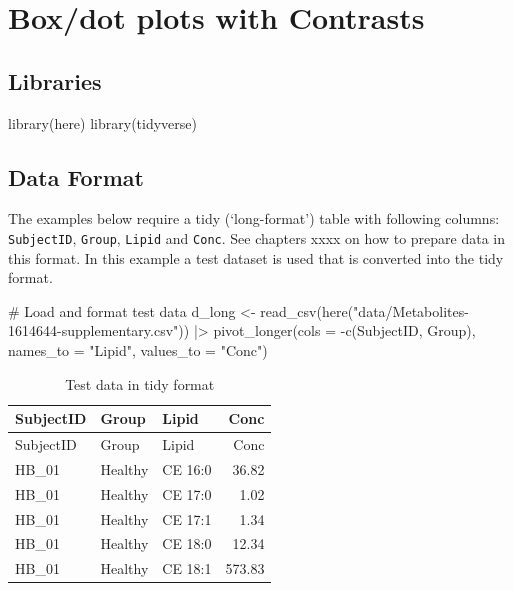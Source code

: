 \documentclass[
  letterpaper,
  DIV=11,
  numbers=noendperiod]{scrreprt}
\newenvironment{Shaded}{\begin{snugshade}}{\end{snugshade}}
\newcommand{\AttributeTok}[1]{\textcolor[rgb]{0.40,0.45,0.13}{#1}}
\newcommand{\CommentTok}[1]{\textcolor[rgb]{0.37,0.37,0.37}{#1}}
\newcommand{\FunctionTok}[1]{\textcolor[rgb]{0.28,0.35,0.67}{#1}}
\newcommand{\NormalTok}[1]{\textcolor[rgb]{0.00,0.23,0.31}{#1}}
\newcommand{\OtherTok}[1]{\textcolor[rgb]{0.00,0.23,0.31}{#1}}
\newcommand{\SpecialCharTok}[1]{\textcolor[rgb]{0.37,0.37,0.37}{#1}}
\newcommand{\StringTok}[1]{\textcolor[rgb]{0.13,0.47,0.30}{#1}}
\begin{document}
\hypertarget{boxdot-plots-with-contrasts}{%
\chapter{Box/dot plots with
Contrasts}\label{boxdot-plots-with-contrasts}}

\hypertarget{libraries-3}{%
\section{Libraries}\label{libraries-3}}

\begin{Shaded}
\begin{Highlighting}[]
\FunctionTok{library}\NormalTok{(here)}
\FunctionTok{library}\NormalTok{(tidyverse)}
\end{Highlighting}
\end{Shaded}

\hypertarget{data-format-2}{%
\section{Data Format}\label{data-format-2}}

The examples below require a tidy (`long-format') table with following
columns: \texttt{SubjectID}, \texttt{Group}, \texttt{Lipid} and
\texttt{Conc}. See chapters xxxx on how to prepare data in this format.
In this example a test dataset is used that is converted into the tidy
format.

\begin{Shaded}
\begin{Highlighting}[]
\CommentTok{\# Load and format test data}
\NormalTok{d\_long }\OtherTok{\textless{}{-}} \FunctionTok{read\_csv}\NormalTok{(}\FunctionTok{here}\NormalTok{(}\StringTok{"data/Metabolites{-}1614644{-}supplementary.csv"}\NormalTok{)) }\SpecialCharTok{|\textgreater{}} 
  \FunctionTok{pivot\_longer}\NormalTok{(}\AttributeTok{cols =} \SpecialCharTok{{-}}\FunctionTok{c}\NormalTok{(SubjectID, Group), }\AttributeTok{names\_to =} \StringTok{"Lipid"}\NormalTok{, }\AttributeTok{values\_to =} \StringTok{"Conc"}\NormalTok{)}
\end{Highlighting}
\end{Shaded}

\hypertarget{tbl-data}{}
\begin{longtable}[]{@{}lllr@{}}
\caption{\label{tbl-data}Test data in tidy format}\tabularnewline
\toprule()
SubjectID & Group & Lipid & Conc \\
\midrule()
\endfirsthead
\toprule()
SubjectID & Group & Lipid & Conc \\
\midrule()
\endhead
HB\_01 & Healthy & CE 16:0 & 36.82 \\
HB\_01 & Healthy & CE 17:0 & 1.02 \\
HB\_01 & Healthy & CE 17:1 & 1.34 \\
HB\_01 & Healthy & CE 18:0 & 12.34 \\
HB\_01 & Healthy & CE 18:1 & 573.83 \\
\bottomrule()
\end{longtable}
\end{document}
